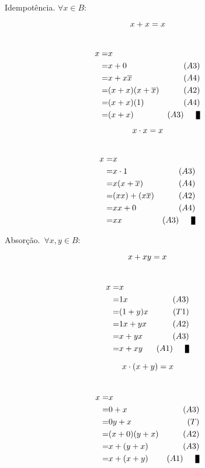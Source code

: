 ~Idempotência.  $\forall x \in B : $

\begin{minipage}{.5\textwidth}
$$x\+x=x$$
\proof\\
\begin{eqnarray*}
x =&x& \hfill\\
  =&x\+0 & (A3)\\
  =&x\+x\~x & (A4)\\
  =&(x\+x)(x\+\~x) & (A2)\\
  =&(x\+x)(1) & (A4)\\
  =&(x\+x) & (A3)\qed\\
\end{eqnarray*}
\end{minipage}
\begin{minipage}{.5\textwidth}
$$x\.x=x$$\\
\begin{eqnarray*}
x =&x& \hfill\\
  =&x\.1 & (A3)\\
  =&x(x\+\~x) & (A4)\\
  =&(xx)\+(x\~x) & (A2)\\
  =&xx \+ 0 & (A4)\\
  =&xx & (A3)\qed\\
\end{eqnarray*}
\end{minipage}


\pagebreak
{}~Absorção.~$\forall x,y \in B : $

\begin{minipage}{.5\textwidth}
$$x\+xy=x$$
\proof\\
\begin{eqnarray*}
x =&x& \hfill\\
  =&1x & (A3)\\
  =&(1\+y)x & (T1)\\
  =&1x \+ yx & (A2)\\
  =&x\+yx & (A3)\\
  =&x\+xy & (A1)\qed\\
\end{eqnarray*}
\end{minipage}
\begin{minipage}{.5\textwidth}
$$x\.(x+y)=x$$\\
\begin{eqnarray*}
x =&x& \hfill\\
  =&0 \+ x & (A3)\\
  =&0y \+ x & (T)\\
  =& (x+0) (y+x) & (A2)\\
  =&x\+ (y\+x) & (A3)\\
  =&x\+ (x\+y) & (A1)\qed\\
\end{eqnarray*}
\end{minipage}


